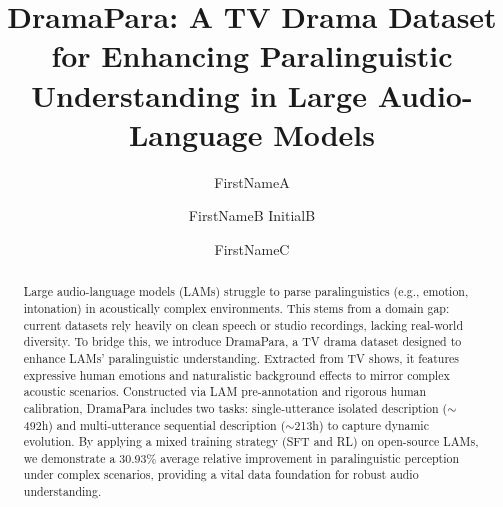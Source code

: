 \documentclass{Interspeech}
\title{DramaPara: A TV Drama Dataset for Enhancing Paralinguistic Understanding in Large Audio-Language Models}
\author[affiliation={1}, orcid=0000-0000-0000-0000, equalcontribution]{FirstNameA}{LastNameA}
\author[affiliation={2,3}, orcid=0000-0000-0000-1111, equalcontribution, correspondingauthor]{FirstNameB InitialB}{LastNameB}
\author[affiliation={1,3}]{FirstNameC}{LastNameC}
\begin{document}
\maketitle

\begin{abstract}
Large audio-language models (LAMs) struggle to parse paralinguistics (e.g., emotion, intonation) in acoustically complex environments. This stems from a domain gap: current datasets rely heavily on clean speech or studio recordings, lacking real-world diversity. To bridge this, we introduce DramaPara, a TV drama dataset designed to enhance LAMs' paralinguistic understanding. Extracted from TV shows, it features expressive human emotions and naturalistic background effects to mirror complex acoustic scenarios. Constructed via LAM pre-annotation and rigorous human calibration, DramaPara includes two tasks: single-utterance isolated description ($\sim$492h) and multi-utterance sequential description ($\sim$213h) to capture dynamic evolution. By applying a mixed training strategy (SFT and RL) on open-source LAMs, we demonstrate a 30.93\% average relative improvement in paralinguistic perception under complex scenarios, providing a vital data foundation for robust audio understanding.
\end{abstract}
\end{document}

